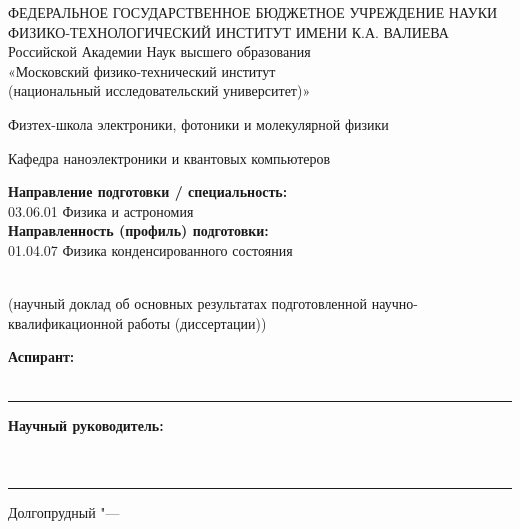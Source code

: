 \newcommand{\sfs}{\fontsize{14pt}{15pt}\selectfont}
\thispagestyle{empty}


\begin{center}
ФЕДЕРАЛЬНОЕ ГОСУДАРСТВЕННОЕ БЮДЖЕТНОЕ УЧРЕЖДЕНИЕ НАУКИ \\
ФИЗИКО-ТЕХНОЛОГИЧЕСКИЙ ИНСТИТУТ ИМЕНИ К.А. ВАЛИЕВА \\
Российской Академии Наук
высшего образования\\ «Московский физико-технический институт\\ (национальный исследовательский университет)»
\end{center}
\begin{center}
Физтех-школа электроники, фотоники и молекулярной физики
\end{center}
\begin{center}
Кафедра наноэлектроники и квантовых компьютеров
\end{center}
\begin{flushleft}
\textbf{Направление подготовки / специальность:}\\
03.06.01 Физика и астрономия\\
\textbf{Направленность (профиль) подготовки:}\\
01.04.07 Физика конденсированного состояния
\end{flushleft}
\vspace{0pt plus4cm}
\begin{center}
\textbf{\Large \thesisTitle}\\[1cm]
(научный доклад об основных результатах подготовленной 
научно-квалификационной работы (диссертации))
\end{center}
\vspace{0pt plus4cm}
\begin{flushright}
\begin{minipage}{0.5\textwidth}
\textbf{Аспирант:}\\
\thesisAuthor\\
\vspace{0.5cm}
\hrule
\vspace{1cm}
\textbf{Научный руководитель:}\\
\supervisorRegalia\\
\supervisorFio\\
\vspace{0.5cm}
\hrule
\end{minipage}
\end{flushright}
\vspace*{\fill}
\begin{center}
{\large{Долгопрудный "--- \thesisYear}}
\end{center}